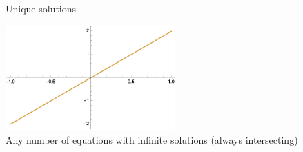 \documentclass[12pt]{article}
\begin{document}
\begin{figure}[!ht]%
    \centering
    \qquad
    \caption{Unique solutions}
    \label{fig:uniquesolutions}%
\end{figure}

\begin{figure}[!ht]
    \centering
    \includegraphics[width=6.5cm]{misc/infinitesolutions.png}
    \caption{Any number of equations with infinite solutions (always intersecting)}
    \label{fig:infinitesolutions}
\end{figure}
\end{document}
